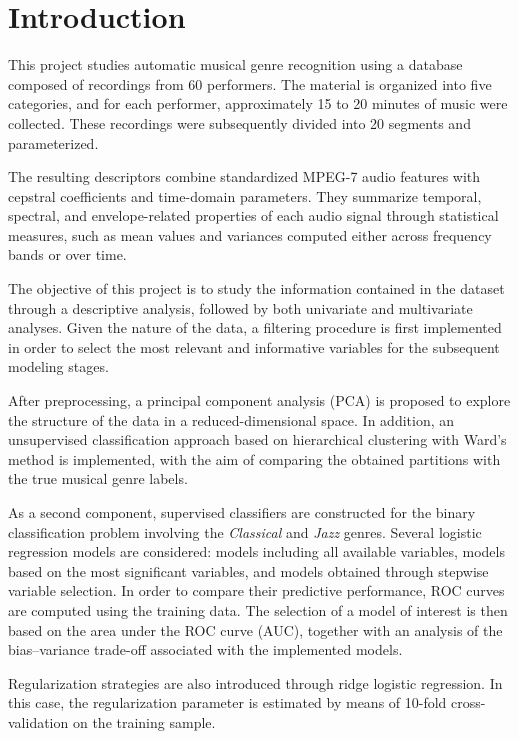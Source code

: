 \section{Introduction}
This project studies automatic musical genre recognition using a database composed of recordings from 60 performers. The material is organized into five categories, and for each performer, approximately 15 to 20 minutes of music were collected. These recordings were subsequently divided into 20 segments and parameterized.

The resulting descriptors combine standardized MPEG-7 audio features with cepstral coefficients and time-domain parameters. They summarize temporal, spectral, and envelope-related properties of each audio signal through statistical measures, such as mean values and variances computed either across frequency bands or over time.

The objective of this project is to study the information contained in the dataset through a descriptive analysis, followed by both univariate and multivariate analyses. Given the nature of the data, a filtering procedure is first implemented in order to select the most relevant and informative variables for the subsequent modeling stages.

After preprocessing, a principal component analysis (PCA) is proposed to explore the structure of the data in a reduced-dimensional space. In addition, an unsupervised classification approach based on hierarchical clustering with Ward's method is implemented, with the aim of comparing the obtained partitions with the true musical genre labels.

As a second component, supervised classifiers are constructed for the binary classification problem involving the \textit{Classical} and \textit{Jazz} genres. Several logistic regression models are considered: models including all available variables, models based on the most significant variables, and models obtained through stepwise variable selection. In order to compare their predictive performance, ROC curves are computed using the training data. The selection of a model of interest is then based on the area under the ROC curve (AUC), together with an analysis of the bias--variance trade-off associated with the implemented models.

Regularization strategies are also introduced through ridge logistic regression. In this case, the regularization parameter is estimated by means of 10-fold cross-validation on the training sample.

